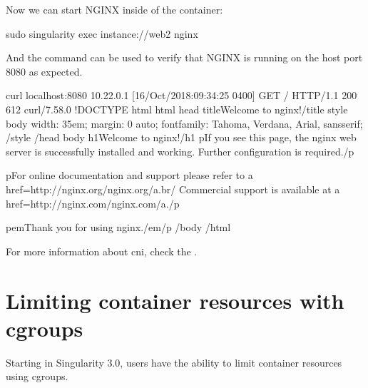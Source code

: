 \documentclass[letterpaper,10pt,english]{sphinxmanual}
\begin{document}
Now we can start NGINX inside of the container:

%
\begin{sphinxVerbatim}[commandchars=\\\{\}]
\PYGZdl{} sudo singularity exec instance://web2 nginx
\end{sphinxVerbatim}

And the  command can be used to verify that NGINX is running on the host
port 8080 as expected.

%
\begin{sphinxVerbatim}[commandchars=\\\{\}]
\PYGZdl{} curl localhost:8080
10.22.0.1 \PYGZhy{} \PYGZhy{} [16/Oct/2018:09:34:25 \PYGZhy{}0400] \PYGZdq{}GET / HTTP/1.1\PYGZdq{} 200 612 \PYGZdq{}\PYGZhy{}\PYGZdq{} \PYGZdq{}curl/7.58.0\PYGZdq{} \PYGZdq{}\PYGZhy{}\PYGZdq{}
\PYGZlt{}!DOCTYPE html\PYGZgt{}
\PYGZlt{}html\PYGZgt{}
\PYGZlt{}head\PYGZgt{}
\PYGZlt{}title\PYGZgt{}Welcome to nginx!\PYGZlt{}/title\PYGZgt{}
\PYGZlt{}style\PYGZgt{}
    body \PYGZob{}
        width: 35em;
        margin: 0 auto;
        font\PYGZhy{}family: Tahoma, Verdana, Arial, sans\PYGZhy{}serif;
    \PYGZcb{}
\PYGZlt{}/style\PYGZgt{}
\PYGZlt{}/head\PYGZgt{}
\PYGZlt{}body\PYGZgt{}
\PYGZlt{}h1\PYGZgt{}Welcome to nginx!\PYGZlt{}/h1\PYGZgt{}
\PYGZlt{}p\PYGZgt{}If you see this page, the nginx web server is successfully installed and
working. Further configuration is required.\PYGZlt{}/p\PYGZgt{}

\PYGZlt{}p\PYGZgt{}For online documentation and support please refer to
\PYGZlt{}a href=\PYGZdq{}http://nginx.org/\PYGZdq{}\PYGZgt{}nginx.org\PYGZlt{}/a\PYGZgt{}.\PYGZlt{}br/\PYGZgt{}
Commercial support is available at
\PYGZlt{}a href=\PYGZdq{}http://nginx.com/\PYGZdq{}\PYGZgt{}nginx.com\PYGZlt{}/a\PYGZgt{}.\PYGZlt{}/p\PYGZgt{}

\PYGZlt{}p\PYGZgt{}\PYGZlt{}em\PYGZgt{}Thank you for using nginx.\PYGZlt{}/em\PYGZgt{}\PYGZlt{}/p\PYGZgt{}
\PYGZlt{}/body\PYGZgt{}
\PYGZlt{}/html\PYGZgt{}
\end{sphinxVerbatim}

For more information about cni, check the
.


\chapter{Limiting container resources with cgroups}
\label{\detokenize{cgroups:limiting-container-resources-with-cgroups}}\label{\detokenize{cgroups:cgroups}}\label{\detokenize{cgroups::doc}}
Starting in Singularity 3.0, users have the ability to limit container resources
using cgroups.
\end{document}
